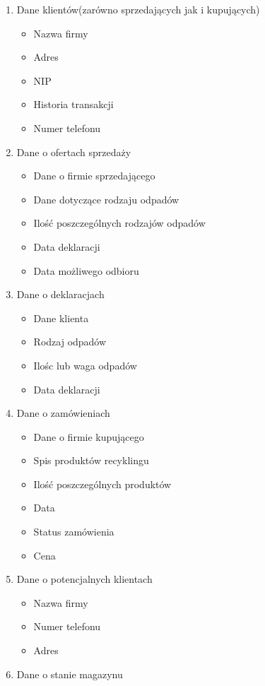 \begin{enumerate}
	\item Dane klientów(zarówno sprzedających jak i kupujących)
	\begin{itemize}
		\item Nazwa firmy
		\item Adres
		\item NIP
		\item Historia transakcji
		\item Numer telefonu
	\end{itemize}
	\item Dane o ofertach sprzedaży
	\begin{itemize}
		\item Dane o firmie sprzedającego
		\item Dane dotyczące rodzaju odpadów
		\item Ilość poszczególnych rodzajów odpadów
		\item Data deklaracji
		\item Data możliwego odbioru
	\end{itemize}
	\item Dane o deklaracjach
	\begin{itemize}
		\item Dane klienta
		\item Rodzaj odpadów
		\item Ilośc lub waga odpadów
		\item Data deklaracji
	\end{itemize}
	\item Dane o zamówieniach
	\begin{itemize}
		\item Dane o firmie kupującego
		\item Spis produktów recyklingu
		\item Ilość poszczególnych produktów
		\item Data
		\item Status zamówienia
		\item Cena
	\end{itemize}
	\item Dane o potencjalnych klientach
	\begin{itemize}
		\item Nazwa firmy
		\item Numer telefonu
		\item Adres
	\end{itemize}
	\item Dane o stanie magazynu

\end{enumerate}

